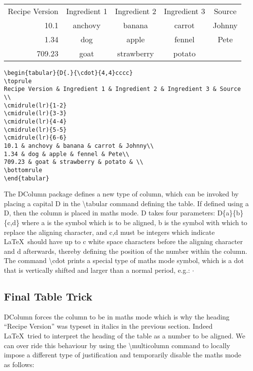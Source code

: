 \begin{center}
\begin{tabular}{D{.}{\cdot}{4,4}cccc}
\toprule
Recipe Version & Ingredient 1 & Ingredient 2 & Ingredient 3 & Source \\
\cmidrule(lr){1-1}
\cmidrule(lr){2-2}
\cmidrule(lr){3-3}
\cmidrule(lr){4-4}
\cmidrule(lr){5-5}
10.1 & anchovy & banana & carrot & Johnny\\
1.34 & dog & apple & fennel & Pete\\
709.23 & goat & strawberry & potato & \\
\bottomrule
\end{tabular}

\vspace*{2ex}

\begin{verbatim}
\begin{tabular}{D{.}{\cdot}{4,4}cccc}
\toprule
Recipe Version & Ingredient 1 & Ingredient 2 & Ingredient 3 & Source \\
\cmidrule(lr){1-2}
\cmidrule(lr){3-3}
\cmidrule(lr){4-4}
\cmidrule(lr){5-5}
\cmidrule(lr){6-6}
10.1 & anchovy & banana & carrot & Johnny\\
1.34 & dog & apple & fennel & Pete\\
709.23 & goat & strawberry & potato & \\
\bottomrule
\end{tabular}
\end{verbatim}
\end{center}

The DColumn package defines a new type of column, which can be invoked by placing a capital D in the {\textbackslash}tabular command defining the table. If defined using a D, then the column is placed in maths mode. D takes four parameters: D\{a\}\{b\}\{c,d\} where a is the symbol which is to be aligned, b is the symbol with which to replace the aligning character, and {c,d} must be integers which indicate \LaTeX\ should have up to c white space characters before the aligning character and d afterwards, thereby defining the position of the number within the column. The command {\textbackslash}cdot prints a special type of maths mode symbol, which is a dot that is vertically shifted and larger than a normal period, e.g.: $\cdot$

\pagebreak
\subsection{Final Table Trick}
DColumn forces the column to be in maths mode which is why the heading ``Recipe Version'' was typeset in italics in the previous section. Indeed \LaTeX\ tried to interpret the heading of the table as a number to be aligned.  We can over ride this behaviour by using the {\textbackslash}multicolumn command to locally impose a different type of justification and temporarily disable the maths mode as follows:

